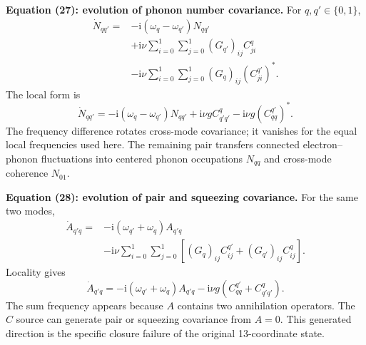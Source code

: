 \documentclass[10pt,letterpaper,twocolumn]{article}
\newcommand{\ii}{\mathrm i}
\begin{document}
\textbf{Equation (27): evolution of phonon number covariance.}
For \(q,q'\in\{0,1\}\),
\[
\begin{aligned}
\dot N_{qq'}={}&-\ii(\omega_q-\omega_{q'})N_{qq'}\\
&+\ii\nu\sum_{i=0}^{1}\sum_{j=0}^{1}
       (G_{q'})_{ij}C^q_{ji}\\
&-\ii\nu\sum_{i=0}^{1}\sum_{j=0}^{1}
       (G_q)_{ij}(C^{q'}_{ji})^\ast .
\end{aligned}
\tag{27}
\]
The local form is
\[
\dot N_{qq'}
=-\ii(\omega_q-\omega_{q'})N_{qq'}
+\ii\nu g C^q_{q'q'}
-\ii\nu g(C^{q'}_{qq})^\ast.
\]
The frequency difference rotates cross-mode covariance; it vanishes for the
equal local frequencies used here.  The remaining pair transfers connected
electron--phonon fluctuations into centered phonon occupations
\(N_{qq}\) and cross-mode coherence \(N_{01}\).

\textbf{Equation (28): evolution of pair and squeezing covariance.}
For the same two modes,
\[
\begin{aligned}
\dot A_{q'q}={}&-\ii(\omega_{q'}+\omega_q)A_{q'q}\\
&-\ii\nu\sum_{i=0}^{1}\sum_{j=0}^{1}
\left[(G_q)_{ij}C^{q'}_{ij}
      +(G_{q'})_{ij}C^q_{ij}\right].
\end{aligned}
\tag{28}
\]
Locality gives
\[
\dot A_{q'q}
=-\ii(\omega_{q'}+\omega_q)A_{q'q}
-\ii\nu g\left(C^{q'}_{qq}+C^q_{q'q'}\right).
\]
The sum frequency appears because \(A\) contains two annihilation operators.
The \(C\) source can generate pair or squeezing covariance from \(A=0\).
This generated direction is the specific closure failure of the original
13-coordinate state.
\end{document}
